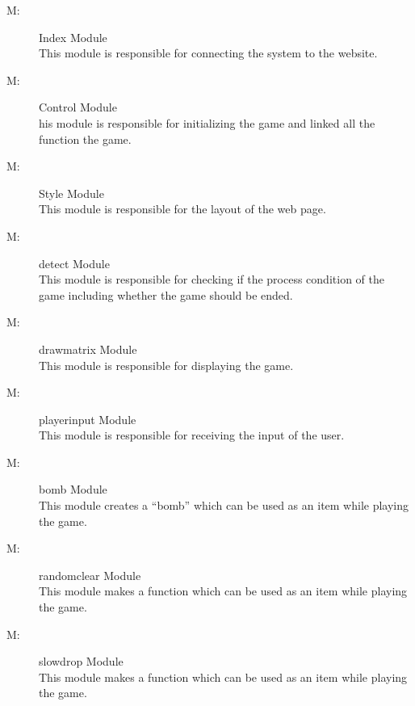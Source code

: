 \documentclass[12pt, titlepage]{article}
\newcounter{mnum}
\newcommand{\mthemnum}{M\themnum}
\begin{document}
\begin{description}
\item [ \mthemnum \label{mIM}:] Index Module\\
This module is responsible for connecting the system to the website.
\item  [ \mthemnum \label{mCM}:] Control Module\\
his module is responsible for initializing the game and linked all the function the game.
\item  [ \mthemnum \label{mSM}:] Style Module\\
This module is responsible for the layout of the web page.
\item  [ \mthemnum \label{mDM}:] detect Module\\
This module is responsible for checking if the process condition of the game including whether the game should be ended.
\item  [ \mthemnum \label{mDMM}:] drawmatrix Module\\
This module is responsible for displaying the game.
\item  [ \mthemnum \label{mPIM}:] playerinput Module\\
This module is responsible for receiving the input of the user.
\item  [ \mthemnum \label{mBM}:] bomb Module\\
This module creates a “bomb” which can be used as an item while playing the game.
\item  [ \mthemnum \label{mRCM}:] randomclear Module\\
This module makes a function which can be used as an item while playing the game.
\item  [ \mthemnum \label{mSDM}:] slowdrop Module\\
This module makes a function which can be used as an item while playing the game.
\end{description}
\end{document}
